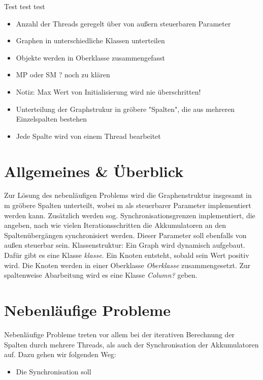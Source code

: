 
\usepackage{pdfpages}
\usepackage{listings}



\newcommand{\subttl}{\textbf{Milestone 1}}
\newcommand{\StudNameOne}{Jens Heinen (2542182)}
\newcommand{\StudNameTwo}{Lukas Schaal (2539218)}
\newcommand{\StudNameThree}{Christoph Rosenhauer (2549220)}

\newcommand{\ndt}{Nichtdeterminismus }
Test test test

\begin{itemize}
	\item Anzahl der Threads geregelt über von außern steuerbaren Parameter
	\item Graphen in unterschiedliche Klassen unterteilen
	\item Objekte werden in Oberklasse zusammengefasst 
	\item MP oder SM ? noch zu klären
	\item Notiz: Max Wert von Initialisierung wird nie überschritten!
	\item Unterteilung der Graphstrukur in gröbere "Spalten", die aus mehreren Einzelspalten bestehen
	\item Jede Spalte wird von einem Thread bearbeitet
	
\end{itemize}


\section{Allgemeines \& Überblick}
Zur Lösung des nebenläufigen Problems wird die Graphenstruktur insgesamt in m gröbere Spalten unterteilt, wobei m als steuerbarer Parameter implementiert werden kann. Zusätz\-lich werden sog. Synchronisationsgrenzen implementiert, die angeben, nach wie vielen Iterationsschritten die Akkumulatoren an den Spaltenübergängen synchronisiert werden. Dieser Parameter soll ebenfalls von außen steuerbar sein. 
Klassenstruktur: 
Ein Graph wird dynamisch aufgebaut. Dafür gibt es eine Klasse \textit{klasse}. Ein Knoten entsteht, sobald sein Wert positiv wird. Die Knoten werden in einer Oberklasse \textit{Oberklasse} zusammengesetzt. Zur spaltenweise Abarbeitung wird es eine Klasse \textit{Column?} geben. 

\section{Nebenläufige Probleme}
Nebenläufige Probleme treten vor allem bei der iterativen Berechnung der Spalten durch mehrere Threads, als auch der Synchronisation der Akkumulatoren auf. Dazu gehen wir folgenden Weg:
\begin{itemize}
	\item Die Synchronisation soll 
\end{itemize}


